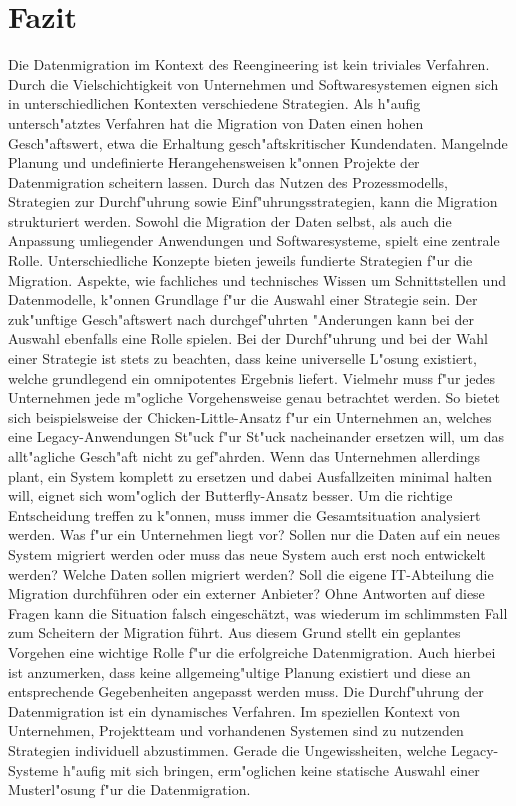 \section{Fazit}
\label{chapter:fazit}

Die Datenmigration im Kontext des Reengineering ist kein triviales Verfahren. Durch die Vielschichtigkeit von Unternehmen und Softwaresystemen eignen sich in unterschiedlichen Kontexten verschiedene Strategien. Als h"aufig untersch"atztes Verfahren hat die Migration von Daten einen hohen Gesch"aftswert, etwa die Erhaltung gesch"aftskritischer Kundendaten. Mangelnde Planung und undefinierte Herangehensweisen k"onnen Projekte der Datenmigration scheitern lassen. Durch das Nutzen des Prozessmodells, Strategien zur Durchf"uhrung sowie Einf"uhrungsstrategien, kann die Migration strukturiert werden.
\lb
Sowohl die Migration der Daten selbst, als auch die Anpassung umliegender Anwendungen und Softwaresysteme, spielt eine zentrale Rolle. Unterschiedliche Konzepte bieten jeweils fundierte Strategien f"ur die Migration. Aspekte, wie fachliches und technisches Wissen um Schnittstellen und Datenmodelle, k"onnen Grundlage f"ur die Auswahl einer Strategie sein. Der zuk"unftige Gesch"aftswert nach durchgef"uhrten "Anderungen kann bei der Auswahl ebenfalls eine Rolle spielen. 
\lb
Bei der Durchf"uhrung und bei der Wahl einer Strategie ist stets zu beachten, dass keine universelle L"osung existiert, welche grundlegend ein omnipotentes Ergebnis liefert. Vielmehr muss f"ur jedes Unternehmen jede m"ogliche Vorgehensweise genau betrachtet werden. So bietet sich beispielsweise der Chicken-Little-Ansatz f"ur ein Unternehmen an, welches eine Legacy-Anwendungen St"uck f"ur St"uck nacheinander ersetzen will, um das allt"agliche Gesch"aft nicht zu gef"ahrden. Wenn das Unternehmen allerdings plant, ein System komplett zu ersetzen und dabei Ausfallzeiten minimal halten will, eignet sich wom"oglich der Butterfly-Ansatz besser.
\lb
Um die richtige Entscheidung treffen zu k"onnen, muss immer die Gesamtsituation analysiert werden. Was f"ur ein Unternehmen liegt vor? Sollen nur die Daten auf ein neues System migriert werden oder muss das neue System auch erst noch entwickelt werden? Welche Daten sollen migriert werden? Soll die eigene IT-Abteilung die Migration durchführen oder ein externer Anbieter? Ohne Antworten auf diese Fragen kann die Situation falsch eingeschätzt, was wiederum im schlimmsten Fall zum Scheitern der Migration führt. Aus diesem Grund stellt ein geplantes Vorgehen eine wichtige Rolle f"ur die erfolgreiche Datenmigration. Auch hierbei ist anzumerken, dass keine allgemeing"ultige Planung existiert und diese an entsprechende Gegebenheiten angepasst werden muss. 
\lb
Die Durchf"uhrung der Datenmigration ist ein dynamisches Verfahren. Im speziellen Kontext von Unternehmen, Projektteam und vorhandenen Systemen sind zu nutzenden Strategien individuell abzustimmen. Gerade die Ungewissheiten, welche Legacy-Systeme h"aufig mit sich bringen, erm"oglichen keine statische Auswahl einer Musterl"osung f"ur die Datenmigration.